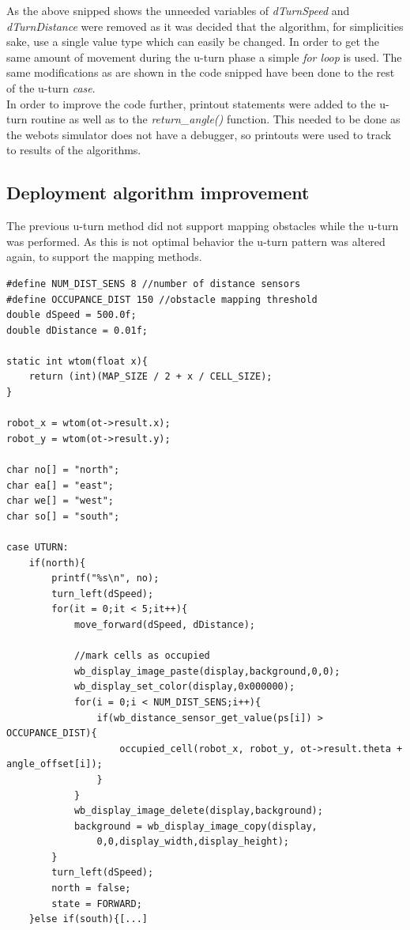 As the above snipped shows the unneeded variables of \textit{dTurnSpeed} and \textit{dTurnDistance} were removed as it was decided that the algorithm, for simplicities sake, use a single value type which can easily be changed. In order to get the same amount of movement during the u-turn phase a simple \textit{for loop} is used. The same modifications as are shown in the code snipped have been done to the rest of the u-turn \textit{case}. \\
In order to improve the code further, printout statements were added to the u-turn routine as well as to the \textit{return\_angle()} function.
This needed to be done as the webots simulator does not have a debugger, so printouts were used to track to results of the algorithms.

\subsection{Deployment algorithm improvement}
\label{deployment_improvement}
The previous u-turn method did not support mapping obstacles while the u-turn was performed. As this is not optimal behavior the u-turn pattern was altered again, to support the mapping methods. 

\begin{lstlisting}[caption={U-turn improved with obstacle detection and mapping}, label={uturn_code}]
#define NUM_DIST_SENS 8 //number of distance sensors 
#define OCCUPANCE_DIST 150 //obstacle mapping threshold
double dSpeed = 500.0f;
double dDistance = 0.01f;

static int wtom(float x){
	return (int)(MAP_SIZE / 2 + x / CELL_SIZE);
}

robot_x = wtom(ot->result.x);
robot_y = wtom(ot->result.y);

char no[] = "north";
char ea[] = "east";
char we[] = "west";
char so[] = "south";

case UTURN:
	if(north){
		printf("%s\n", no);
		turn_left(dSpeed);
		for(it = 0;it < 5;it++){
			move_forward(dSpeed, dDistance);
			
			//mark cells as occupied
			wb_display_image_paste(display,background,0,0);
			wb_display_set_color(display,0x000000);
			for(i = 0;i < NUM_DIST_SENS;i++){
				if(wb_distance_sensor_get_value(ps[i]) > OCCUPANCE_DIST){
					occupied_cell(robot_x, robot_y, ot->result.theta + angle_offset[i]);
				}
			}
			wb_display_image_delete(display,background);
			background = wb_display_image_copy(display,
				0,0,display_width,display_height); 
		}
		turn_left(dSpeed);
		north = false;
		state = FORWARD;
	}else if(south){[...]
\end{lstlisting}

